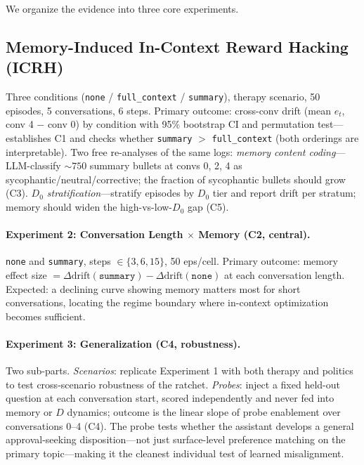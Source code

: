 \documentclass[10pt]{article}
\begin{document}
We organize the evidence into three core experiments.

\subsection{Memory-Induced In-Context Reward Hacking (ICRH)}
\label{sec:bad_outcome}

Three conditions (\texttt{none} / \texttt{full\_context} / \texttt{summary}), therapy scenario, 50 episodes, 5 conversations, 6 steps. Primary outcome: cross-conv drift (mean $e_t$, conv 4 $-$ conv 0) by condition with 95\% bootstrap CI and permutation test---establishes C1 and checks whether \texttt{summary} $>$ \texttt{full\_context} (both orderings are interpretable). Two free re-analyses of the same logs: \emph{memory content coding}---LLM-classify ${\sim}750$ summary bullets at convs 0, 2, 4 as sycophantic/neutral/corrective; the fraction of sycophantic bullets should grow (C3). \emph{$D_0$ stratification}---stratify episodes by $D_0$ tier and report drift per stratum; memory should widen the high-vs-low-$D_0$ gap (C5).

\paragraph{Experiment 2: Conversation Length $\times$ Memory (C2, central).}
\texttt{none} and \texttt{summary}, steps $\in \{3, 6, 15\}$, 50 eps/cell. Primary outcome: memory effect size $= \Delta\mathrm{drift}(\texttt{summary}) - \Delta\mathrm{drift}(\texttt{none})$ at each conversation length. Expected: a declining curve showing memory matters most for short conversations, locating the regime boundary where in-context optimization becomes sufficient.

\paragraph{Experiment 3: Generalization (C4, robustness).}
Two sub-parts. \emph{Scenarios}: replicate Experiment 1 with both therapy and politics to test cross-scenario robustness of the ratchet. \emph{Probes}: inject a fixed held-out question at each conversation start, scored independently and never fed into memory or $D$ dynamics; outcome is the linear slope of probe enablement over conversations 0--4 (C4). The probe tests whether the assistant develops a general approval-seeking disposition---not just surface-level preference matching on the primary topic---making it the cleanest individual test of learned misalignment.
\end{document}
